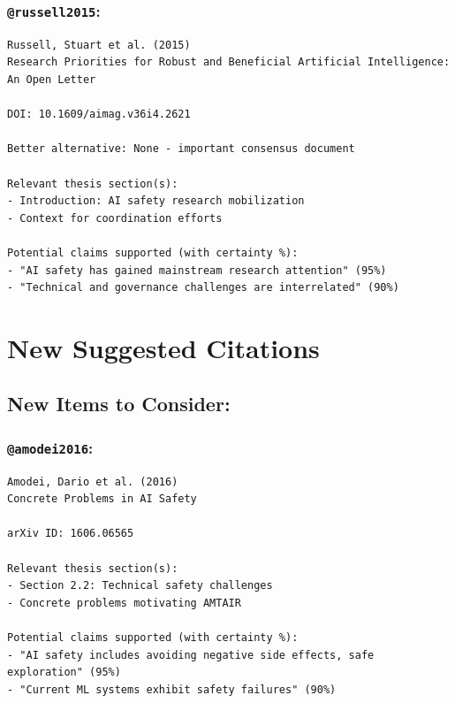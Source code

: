 \documentclass[
  11pt,
  letterpaper,
]{book}
\begin{document}
\subsubsection{\texorpdfstring{\texttt{@russell2015}:
\textcite{russell2015}}{@russell2015: @russell2015}}\label{russell2015-russell2015-1}

\begin{verbatim}
Russell, Stuart et al. (2015)
Research Priorities for Robust and Beneficial Artificial Intelligence: An Open Letter

DOI: 10.1609/aimag.v36i4.2621

Better alternative: None - important consensus document

Relevant thesis section(s):
- Introduction: AI safety research mobilization
- Context for coordination efforts

Potential claims supported (with certainty %):
- "AI safety has gained mainstream research attention" (95%)
- "Technical and governance challenges are interrelated" (90%)
\end{verbatim}

\section{New Suggested Citations}\label{new-suggested-citations-1}

\subsection{New Items to Consider:}\label{new-items-to-consider-1}

\subsubsection{\texorpdfstring{\texttt{@amodei2016}:
\textcite{amodei2016}}{@amodei2016: @amodei2016}}\label{amodei2016-amodei2016-1}

\begin{verbatim}
Amodei, Dario et al. (2016)
Concrete Problems in AI Safety

arXiv ID: 1606.06565

Relevant thesis section(s):
- Section 2.2: Technical safety challenges
- Concrete problems motivating AMTAIR

Potential claims supported (with certainty %):
- "AI safety includes avoiding negative side effects, safe exploration" (95%)
- "Current ML systems exhibit safety failures" (90%)
\end{verbatim}
\end{document}

